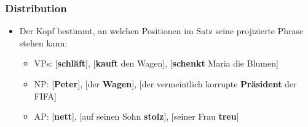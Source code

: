 \subsubsection{Distribution}


\begin{frame}

\begin{itemize}
	\item Der Kopf bestimmt, an welchen Positionen im Satz seine projizierte Phrase stehen kann:
	\begin{itemize}
		\item VPs: [\textbf{schläft}], [\textbf{kauft} den Wagen], [\textbf{schenkt} Maria die Blumen]
		\item NP: [\textbf{Peter}], [der \textbf{Wagen}], [der vermeintlich korrupte \textbf{Präsident} der FIFA]
		\item AP: [\textbf{nett}], [auf seinen Sohn \textbf{stolz}], [seiner Frau \textbf{treu}]
\end{itemize}
	\pause



\z

\z 
	
	
\end{itemize}

\end{frame}


